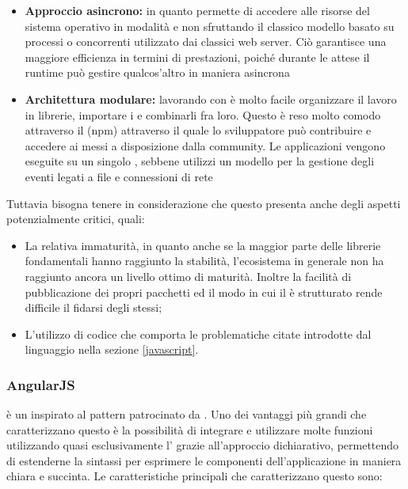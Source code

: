 \documentclass[12pt,a4paper]{article}
\begin{document}
\begin{itemize}
	\item \textbf{Approccio asincrono:} in quanto permette di accedere alle risorse del sistema operativo in modalità  e non sfruttando il classico modello basato su processi o  concorrenti utilizzato dai classici web server. Ciò garantisce una maggiore efficienza in termini di prestazioni, poiché durante le attese il runtime può gestire qualcos’altro in maniera asincrona
	\item \textbf{Architettura modulare:} lavorando con  è molto facile organizzare il lavoro in librerie, importare i  e combinarli fra loro. Questo è reso molto comodo attraverso il  (npm) attraverso il quale lo sviluppatore può contribuire e
	accedere ai  messi a disposizione dalla community.
	Le applicazioni  vengono eseguite su un singolo , sebbene  utilizzi un modello  per la gestione degli eventi legati a file e connessioni di rete
\end{itemize}
Tuttavia bisogna tenere in considerazione che questo  presenta anche degli aspetti potenzialmente critici, quali:
\begin{itemize}
	\item La relativa immaturità, in quanto anche se la maggior parte delle librerie fondamentali hanno raggiunto la stabilità, l'ecosistema in generale non ha raggiunto ancora un livello ottimo di maturità. Inoltre la facilità di pubblicazione dei propri pacchetti ed il modo in cui il  è strutturato rende difficile il fidarsi degli stessi;
	\item L'utilizzo di codice  che comporta le problematiche citate introdotte dal linguaggio nella sezione \ref{javascript}.
\end{itemize}

\subsubsection{AngularJS}\label{angularjs}
 è un     inspirato al pattern  patrocinato da . Uno dei vantaggi più grandi che caratterizzano questo  è la possibilità di integrare e utilizzare molte funzioni utilizzando quasi esclusivamente l’ grazie all’approccio dichiarativo, permettendo di estenderne la sintassi per esprimere le componenti dell’applicazione in maniera chiara e succinta. Le caratteristiche principali che caratterizzano questo  sono:
\end{document}
